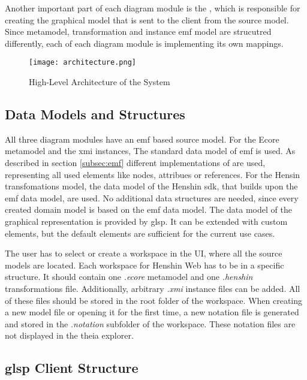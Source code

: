  Another important part of each diagram module is the , which is responsible for creating the graphical model that is sent to the client from the source model. Since metamodel, transformation and instance \ac{emf} model are strucutred differently, each  of each diagram module is implementing its own mappings.

  \begin{figure}
    \centering
    \texttt{[image: architecture.png]}
    \caption{High-Level Architecture of the System}
    \label{fig:architecture}
  \end{figure}

  \subsection{Data Models and Structures}
  \label{subsec:data-models}

  All three diagram modules have an \ac{emf} based source model. For the Ecore metamodel and the \ac{xmi} instances, The standard data model of \ac{emf} is used. As described in section \ref{subsec:emf} different implementations of  are used, representing all used elements like nodes, attribues or references. For the Hensin transfomations model, the data model of the Henshin \ac{sdk}, that builds upon the \ac{emf} data model, are used. No additional data structures are needed, since every created domain model is based on the \ac{emf} data model. The data model of the graphical representation is provided by \ac{glsp}. It can be extended with custom elements, but the default elements are sufficient for the current use cases. 

  The user has to select or create a workspace in the UI, where all the source models are located. Each workspace for Henshin Web has to be in a specific structure. It should contain one \textit{.ecore} metamodel and one \textit{.henshin} transformations file. Additionally, arbitrary \textit{.xmi} instance files can be added. All of these files should be stored in the root folder of the workspace. When creating a new model file or opening it for the first time, a new notation file is generated and stored in the \textit{.notation} subfolder of the workspace. These notation files are not displayed in the theia explorer.  

  \subsection{\ac{glsp} Client Structure}
  \label{subsec:component-design}

